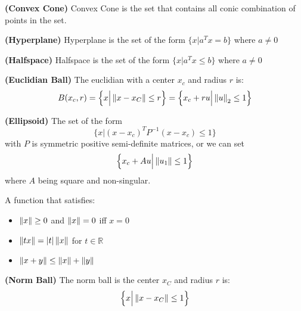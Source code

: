 \begin{definition}{\textbf{(Convex Cone)}}
    Convex Cone is the set that contains all conic combination of points in the set. 
\end{definition}

\begin{definition}{\textbf{(Hyperplane)}}
    Hyperplane is the set of the form $\{ x | a^Tx = b \}$ where $a\ne0$
\end{definition}

\begin{definition}{\textbf{(Halfspace)}}
    Halfspace is the set of the form $\{x | a^Tx \le b\}$ where $a\ne0$
\end{definition}

\begin{definition}{\textbf{(Euclidian Ball)}}
    The euclidian with a center $x_c$ and radius $r$ is:
    \begin{equation*}
        B(x_c, r) = \Big\{ x \Big| \left\lVert x-x_C\right\rVert \le r \Big\} = \Big\{ x_c + ru \Big| \left\lVert u\right\rVert_2\le1 \Big\}
    \end{equation*}
\end{definition}

\begin{definition}{\textbf{(Ellipsoid)}}
    The set of the form 
    \begin{equation*}
        \Big\{ x \Big| (x-x_c)^TP^{-1}(x-x_c)\le1 \Big\}
    \end{equation*}
    with $P$ is symmetric positive semi-definite matrices, or we can set 
    \begin{equation*} 
        \Big\{ x_c + Au \Big| \left\lVert u_1\right\rVert\le1 \Big\}
    \end{equation*}
    where $A$ being square and non-singular. 
\end{definition}

\begin{definition}
    A function that satisfies:
    \begin{itemize}
        \item $\left\lVert x\right\rVert\ge0$ and $\left\lVert x\right\rVert = 0$ iff $x = 0$
        \item $\left\lVert tx\right\rVert = |t|\left\lVert x\right\rVert$ for $t\in \mathbb{R}$
        \item $\left\lVert x+y\right\rVert\le\left\lVert x\right\rVert + \left\lVert y\right\rVert$
    \end{itemize}
\end{definition}

\begin{definition}{\textbf{(Norm Ball)}}
    The norm ball is the center $x_C$ and radius $r$ is:
    \begin{equation*}
        \Big\{ x \Big| \left\lVert x-x_C\right\rVert\le1 \Big\}
    \end{equation*}
\end{definition}

